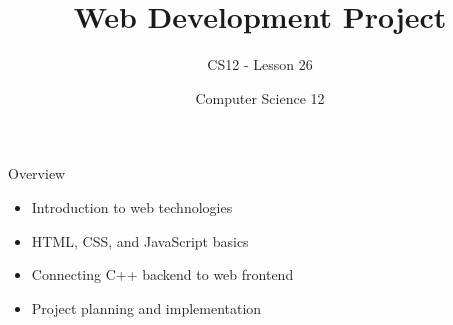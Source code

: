 \documentclass[10pt]{beamer}
\title{Web Development Project}
\subtitle{CS12 - Lesson 26}
\author{Computer Science 12}
\date{}
\begin{document}
\begin{frame}
    \titlepage
\end{frame}

\begin{frame}{Overview}
    \begin{itemize}
        \item Introduction to web technologies
        \item HTML, CSS, and JavaScript basics
        \item Connecting C++ backend to web frontend
        \item Project planning and implementation
    \end{itemize}
\end{frame}

\end{document}
